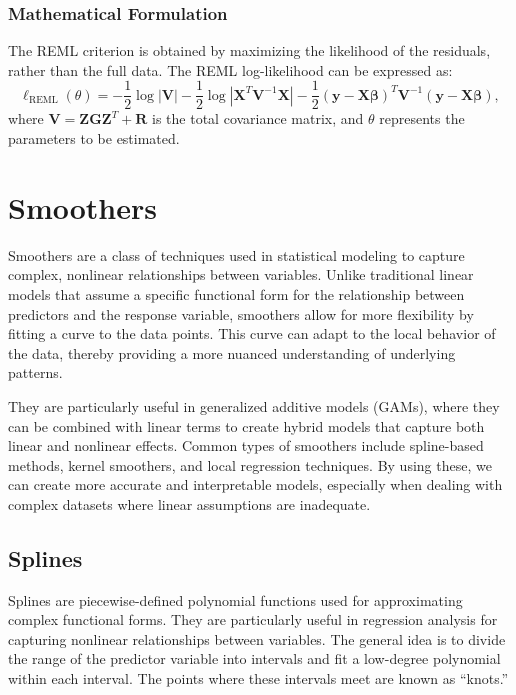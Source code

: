 \documentclass[12pt, twoside,hidelinks]{article}
\theoremstyle{definition}
\numberwithin{equation}{section}
\begin{document}
\subsubsection{Mathematical Formulation}

The REML criterion is obtained by maximizing the likelihood of the residuals, rather than the full data. The REML log-likelihood can be expressed as:
\begin{equation}
    \ell_{\text{REML}}(\theta) = -\frac{1}{2} \log |\mathbf{V}| -\frac{1}{2} \log |\mathbf{X}^T \mathbf{V}^{-1} \mathbf{X}| -\frac{1}{2} (\mathbf{y} - \mathbf{X}\boldsymbol{\beta})^T \mathbf{V}^{-1} (\mathbf{y} - \mathbf{X}\boldsymbol{\beta}),
\end{equation}
where \(\mathbf{V} = \mathbf{Z}\mathbf{G}\mathbf{Z}^T + \mathbf{R}\) is the total covariance matrix, and \(\theta\) represents the parameters to be estimated.


\section{Smoothers}



Smoothers are a class of techniques used in statistical modeling to capture complex, nonlinear relationships between variables. Unlike traditional linear models that assume a specific functional form for the relationship between predictors and the response variable, smoothers allow for more flexibility by fitting a curve to the data points.
This curve can adapt to the local behavior of the data, thereby providing a more nuanced understanding of underlying patterns.
\newline

They are particularly useful in generalized additive models (GAMs), where they can be combined with linear terms to create hybrid models that capture both linear and nonlinear effects. Common types of smoothers include spline-based methods, kernel smoothers, and local regression techniques. By using these, we can create more accurate and interpretable models, especially when dealing with complex datasets where linear assumptions are inadequate.



\subsection{Splines}
Splines are piecewise-defined polynomial functions used for approximating complex functional forms. They are particularly useful in regression analysis for capturing nonlinear relationships between variables. The general idea is to divide the range of the predictor variable into intervals and fit a low-degree polynomial within each interval. The points where these intervals meet are known as ``knots.''
\end{document}
